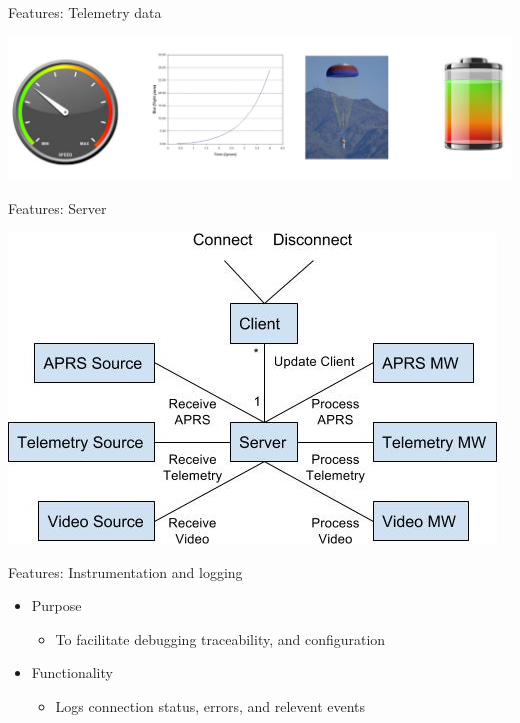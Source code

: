 \documentclass[smaller, aspectratio=169]{beamer}
\begin{document}
  \begin{frame}{Features: Telemetry data}
    \begin{center}
      \includegraphics[scale=.45]{./imgs/tel-data.png}
    \end{center}
  \end{frame}


    \begin{frame}{Features: Server}
      \begin{center}
        \includegraphics[scale=.7]{./imgs/web-server.jpg}
      \end{center}
    \end{frame}

    \begin{frame}{Features: Instrumentation and logging}
      \begin{itemize}
        \item Purpose
        \begin{itemize}
          \item To facilitate debugging traceability, and configuration
        \end{itemize}
        \item Functionality
        \begin{itemize}
          \item Logs connection status, errors, and relevent events
        \end{itemize}
      \end{itemize}
    \end{frame}
\end{document}
